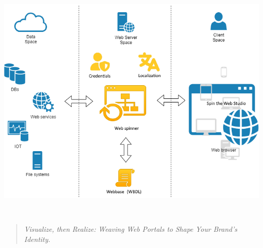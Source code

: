 \begin{titlepage}
\centering

\makeatletter
{\Huge\bfseries \@title\\[0.5cm]}

\ifx\@subtitle\@empty\else
{\Large \@subtitle\\[1.5cm]}
\fi

\vspace*{\fill}
\includegraphics[width=\textwidth]{figures/spin-the-web.png}
\vspace*{\fill}


{\large \organization\\[0.5cm]}

\begin{quote}
\centering
\textit{Visualize, then Realize: Weaving Web Portals to Shape Your Brand’s Identity.}
\end{quote}

\end{titlepage}

